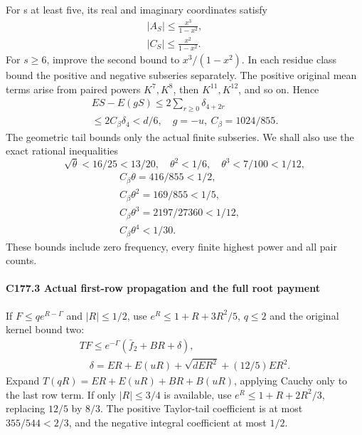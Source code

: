For s at least five, its real and imaginary coordinates satisfy
\[
\begin{gathered}
|A_S|\le\frac{x^3}{1-x^2},\qquad\\
|C_S|\le\frac{x^2}{1-x^2}.
\end{gathered}\tag{C177.T184.10}
\]
For \(s\ge6\), improve the second bound to \(x^3/(1-x^2)\). In each residue class bound the positive and negative subseries separately. The positive original mean terms arise from paired powers \(K^7,\allowbreak \allowbreak  K^8\), then \(K^{11},\allowbreak \allowbreak  K^{12}\), and so on. Hence
\[
\begin{gathered}
ES-E(gS)\le2\sum_{r\ge0}\delta_{4+2r}\\
\le2C_\beta \delta_4<d/6,\quad g=-u,\ C_\beta=1024/855.
\end{gathered}\tag{C177.T184.11}
\]
The geometric tail bounds only the actual finite subseries. We shall also use the exact rational inequalities
\[
\sqrt\theta<16/25<13/20,\quad\theta^2<1/6,\quad
\theta^3<7/100<1/12,
\]
\[
\begin{gathered}
C_\beta\theta=416/855<1/2,\quad\\
C_\beta\theta^2=169/855<1/5,\quad\\
C_\beta\theta^3=2197/27360<1/12,\quad\\
C_\beta\theta^4<1/30.
\end{gathered}\tag{C177.T184.12}
\]
These bounds include zero frequency, every finite highest power and all pair counts.

\paragraph{C177.3 Actual first-row propagation and the full root payment}

If \(F\le qe^{R-\Gamma}\) and \(|R|\le1/2\), use \(e^R\le1+R+3R^2/5\), \(q\le2\) and the original kernel bound two:
\[
\begin{gathered}
TF\le e^{-\Gamma}(\bar f_2+BR+\delta),\\
\quad\delta=ER+E(uR)+\sqrt{dER^2}+(12/5)ER^2.
\end{gathered}\tag{C177.T184.13}
\]
Expand \(T(qR)=ER+E(uR)+BR+B(uR)\), applying Cauchy only to the last row term. If only \(|R|\le3/4\) is available, use \(e^R\le1+R+2R^2/3\), replacing \(12/5\) by \(8/3\). The positive Taylor-tail coefficient is at most \(355/544<2/3\), and the negative integral coefficient at most \(1/2\).

